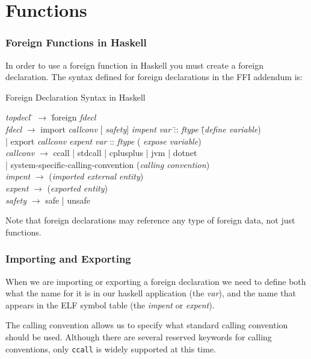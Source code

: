 \documentclass{beamer}
\begin{document}
\section{Functions}
\begin{frame}[fragile]
    \frametitle{Foreign Functions in Haskell}

    In order to use a foreign function in Haskell you must create a foreign
    declaration. The syntax defined for foreign declarations in the FFI addendum is:

    \begin{exampleblock}{Foreign Declaration Syntax in Haskell} \begin{tiny}
        \begin{tabbing} {\it topdecl}  \= $\rightarrow$ \= foreign {\it fdecl}
            \\ {\it fdecl}    \> $\rightarrow$ \> import \= {\it callconv} [{\it
            safety}] {\it impent} {\it var} \= :: \= {\it ftype} \= ({\it define
            variable})\\ \> |             \> export \> {\it callconv} {\it
            expent} {\it var} \> :: \> {\it ftype}                \> ({\it
            expose variable}) \\ {\it callconv} \> $\rightarrow$ \> ccall |
            stdcall | cplusplus | jvm | dotnet \\ \> |             \>
            system-specific-calling-convention \> \> \> \> ({\it calling
            convention})\\ {\it impent}   \> $\rightarrow$ \> [string] \> \> \>
            \> ({\it imported external entity}) \\ {\it expent}   \>
            $\rightarrow$ \> [string] \> \> \> \> ({\it exported entity}) \\
            {\it safety}   \> $\rightarrow$ \> safe | unsafe \end{tabbing}
        \end{tiny} \end{exampleblock}

    Note that foreign declarations may reference any type of foreign data, not
    just functions.
\end{frame}
\begin{frame}
    \frametitle{Importing and Exporting}

    When we are importing or exporting a foreign declaration we need to define
    both what the name for it is in our haskell application (the {\it var}), and
    the name that appears in the ELF symbol table (the {\it impent} or {\it
    expent}).

    The calling convention allows us to specify what standard calling convention
    should be used.  Although there are several reserved keywords for calling
    conventions, only {\tt ccall} is widely supported at this time.
\end{frame}
\end{document}
